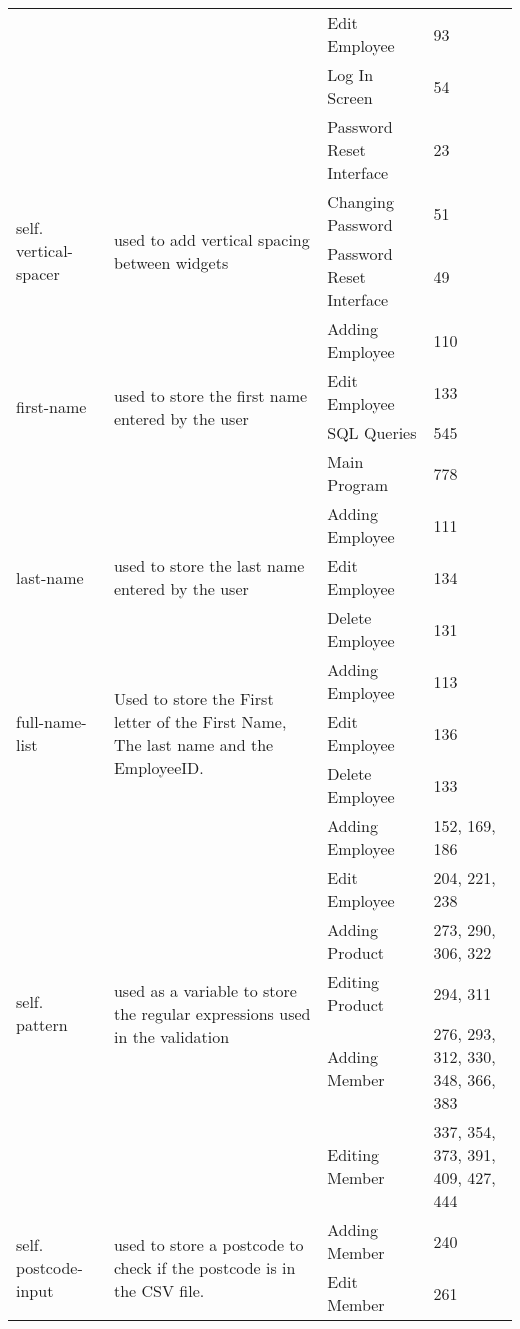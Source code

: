 \begin{center}
\begin{longtable}{|p{1.5cm}|p{4.5cm}|p{1.5cm}|p{3cm}|}
	& & Edit Employee & 93 \\ \cline{3-4}
	& & Log In Screen & 54 \\ \cline{3-4}
	& & Password Reset Interface & 23 \\ \hline
	\multirow{2}{1.5cm}{self. vertical- spacer} & \multirow{2}{4.5cm}{used to add vertical spacing between widgets} & Changing Password &  51 \\ \cline{3-4}
	& & Password Reset Interface &  49 \\ \hline
	\multirow{4}{1.5cm}{first-name} & \multirow{4}{4.5cm}{used to store the first name entered by the user} & Adding Employee &  110 \\ \cline{3-4}
	& & Edit Employee & 133 \\ \cline{3-4}
	& & SQL Queries &  545 \\ \cline{3-4}
	& & Main Program &  778 \\ \hline
	\multirow{3}{1.5cm}{last-name} & \multirow{3}{4.5cm}{used to store the last name entered by the user} & Adding Employee &  111 \\ \cline{3-4}
	& & Edit Employee & 134 \\ \cline{3-4}
	& & Delete Employee & 131 \\ \hline
	\multirow{3}{1.5cm}{full-name-list} & \multirow{3}{4.5cm}{Used to store the First letter of the First Name, The last name and the EmployeeID.} & Adding Employee &  113 \\ \cline{3-4}
	& & Edit Employee & 136 \\ \cline{3-4}
	& & Delete Employee & 133 \\ \hline
	\multirow{6}{1.5cm}{self. pattern} & \multirow{6}{4.5cm}{used as a variable to store the regular expressions used in the validation} & Adding Employee &  152, 169,  186 \\ \cline{3-4}
	& & Edit Employee & 204, 221, 238\\ \cline{3-4}
	& & Adding Product & 273, 290, 306, 322 \\ \cline{3-4}
	& & Editing Product & 294, 311 \\ \cline{3-4}
	& & Adding Member &  276, 293, 312, 330, 348, 366, 383\\ \cline{3-4}
	& & Editing Member & 337, 354, 373, 391, 409, 427, 444 \\ \hline
	\multirow{3}{1.5cm}{self. postcode-input} & \multirow{3}{4.5cm}{used to store a postcode to check if the postcode is in the CSV file.} & Adding Member &  240 \\ \cline{3-4}
	& & Edit Member & 261 \\ \cline{3-4}

\end{longtable}
\end{center}
